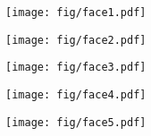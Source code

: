 \begin{figure*}[htbp]
    \begin{subfigure}{0.19\linewidth}
        \begin{minipage}[t]{1.0\linewidth}
            \centering
            \texttt{[image: fig/face1.pdf]}
        \end{minipage}
    \end{subfigure}
    \hfill
    \begin{subfigure}{0.19\linewidth}
        \begin{minipage}[t]{1.0\linewidth}
            \centering
            \texttt{[image: fig/face2.pdf]}
        \end{minipage}
    \end{subfigure}
    \hfill
    \begin{subfigure}{0.19\linewidth}
        \begin{minipage}[t]{1.0\linewidth}
            \centering
            \texttt{[image: fig/face3.pdf]}
        \end{minipage}
    \end{subfigure}
    \hfill
    \begin{subfigure}{0.19\linewidth}
        \begin{minipage}[t]{1.0\linewidth}
            \centering
            \texttt{[image: fig/face4.pdf]}
        \end{minipage}
    \end{subfigure}
    \hfill
    \begin{subfigure}{0.19\linewidth}
        \begin{minipage}[t]{1.0\linewidth}
            \centering
            \texttt{[image: fig/face5.pdf]}
        \end{minipage}
    \end{subfigure}


\end{figure*}

